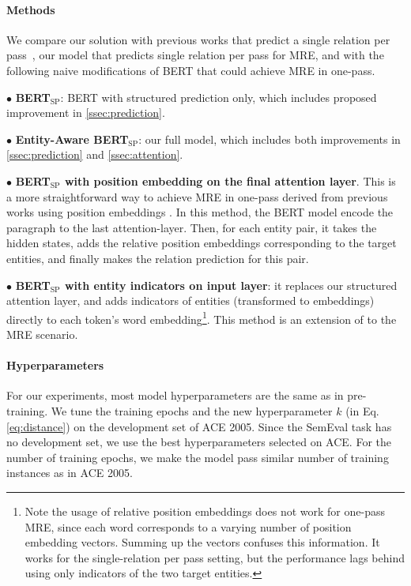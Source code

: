 \documentclass[11pt,a4paper]{article}
\begin{document}
\paragraph{Methods}
We compare our solution with previous works that predict a single relation per pass~\cite{gormley2015improved,nguyen2015combining,fu2017domain,shi2018genre}, our model that predicts single relation per pass for MRE, and with the following naive modifications of BERT that could achieve MRE in one-pass.



\noindent $\bullet$ \textbf{BERT$_{\textrm{SP}}$}: {BERT with structured prediction only}, which includes proposed improvement in \ref{ssec:prediction}.

\noindent $\bullet$ \textbf{Entity-Aware BERT$_{\textrm{SP}}$}: our full model, which includes both improvements in \cref{ssec:prediction} and \cref{ssec:attention}.

\noindent $\bullet$ \textbf{BERT$_{\textrm{SP}}$ with position embedding on the final attention layer}. This is a more straightforward way to achieve MRE in one-pass derived from previous works using position embeddings \cite{nguyen2015combining,fu2017domain,shi2018genre}.
In this method, the BERT model encode the paragraph to the last attention-layer. Then, for each entity pair, it takes the hidden states, adds the relative position embeddings corresponding to the target entities, and finally makes the relation prediction for this pair.

\noindent $\bullet$ \textbf{BERT$_{\textrm{SP}}$ with entity indicators on input layer}: it replaces our structured attention layer, and adds indicators of entities (transformed to embeddings) directly to each token's word embedding\footnote{Note the usage of relative position embeddings does not work for one-pass MRE, since each word corresponds to a varying number of position embedding vectors. Summing up the vectors confuses this information. It works for the single-relation per pass setting, but the performance lags behind using only indicators of the two target entities.}. This method is an extension of \cite{verga2018re} to the MRE scenario. 

\paragraph{Hyperparameters}
For our experiments, most model hyperparameters are the same as in pre-training. We tune the training epochs and the new hyperparameter $k$ (in Eq. \ref{eq:distance}) on the development set of ACE 2005.
Since the SemEval task has no development set, we use the best hyperparameters selected on ACE. For the number of training epochs, we make the model pass similar number of training instances as in ACE 2005.
\end{document}
